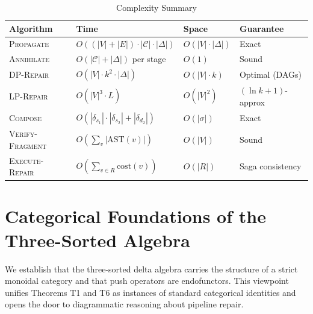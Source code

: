 \documentclass[11pt,a4paper]{article}
\theoremstyle{definition}
\newcommand{\cost}{\mathrm{cost}}
\begin{document}
\begin{table}[htbp]
\centering
\caption{Complexity Summary}
\label{tab:complexity}
\begin{tabular}{@{}llll@{}}
\toprule
\textbf{Algorithm} & \textbf{Time} & \textbf{Space} & \textbf{Guarantee} \\
\midrule
\textsc{Propagate} & $O((|V|{+}|E|) \cdot |\mathcal{C}| \cdot |\Delta|)$ & $O(|V| \cdot |\Delta|)$ & Exact \\
\textsc{Annihilate} & $O(|\mathcal{C}| + |\Delta|)$ per stage & $O(1)$ & Sound \\
\textsc{DP-Repair} & $O(|V| \cdot k^2 \cdot |\Delta|)$ & $O(|V| \cdot k)$ & Optimal (DAGs) \\
\textsc{LP-Repair} & $O(|V|^3 \cdot L)$ & $O(|V|^2)$ & $(\ln k{+}1)$-approx \\
\textsc{Compose} & $O(|\delta_{s_1}| \cdot |\delta_{s_2}| + |\delta_{d_2}|)$ & $O(|\sigma|)$ & Exact \\
\textsc{Verify-Fragment} & $O(\sum_v |\mathrm{AST}(v)|)$ & $O(|V|)$ & Sound \\
\textsc{Execute-Repair} & $O(\sum_{v \in R} \cost(v))$ & $O(|R|)$ & Saga consistency \\
\bottomrule
\end{tabular}
\end{table}


\section{Categorical Foundations of the Three-Sorted Algebra}
\label{sec:categorical}

We establish that the three-sorted delta algebra carries the structure of a
strict monoidal category and that push operators are endofunctors.  This
viewpoint unifies Theorems T1 and T6 as instances of standard categorical
identities and opens the door to diagrammatic reasoning about pipeline repair.
\end{document}
